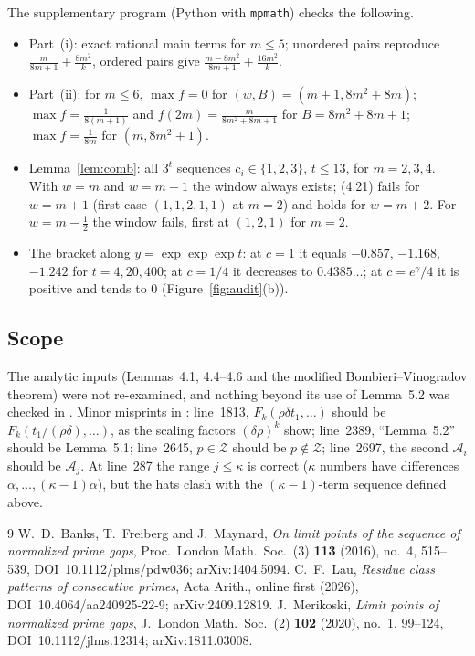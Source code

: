 \documentclass[11pt,a4paper]{amsart}
\theoremstyle{remark}
\newcommand{\cA}{\mathcal{A}}
\begin{document}
The supplementary program (Python with \texttt{mpmath}) checks the following.
\begin{itemize}
\item Part~(i): exact rational main terms for $m\le5$; unordered pairs reproduce $\frac m{8m+1}+\frac{8m^2}k$, ordered
pairs give $\frac{m-8m^2}{8m+1}+\frac{16m^2}k$.
\item Part~(ii): for $m\le6$, $\max f=0$ for $(w,B)=(m+1,8m^2+8m)$; $\max f=\frac1{8(m+1)}$ and $f(2m)=\frac m{8m^2+8m+1}$
for $B=8m^2+8m+1$; $\max f=\frac1{8m}$ for $(m,8m^2+1)$.
\item Lemma~\ref{lem:comb}: all $3^t$ sequences $c_i\in\{1,2,3\}$, $t\le13$, for $m=2,3,4$. With $w=m$ and $w=m+1$
the window always exists; (4.21) fails for $w=m+1$ (first case $(1,1,2,1,1)$ at $m=2$) and holds for $w=m+2$.
For $w=m-\frac12$ the window fails, first at $(1,2,1)$ for $m=2$.
\item The bracket along $y=\exp\exp\exp t$: at $c=1$ it equals $-0.857$, $-1.168$, $-1.242$ for $t=4,20,400$; at
$c=1/4$ it decreases to $0.4385\ldots$; at $c=e^\gamma/4$ it is positive and tends to $0$
(Figure~\ref{fig:audit}(b)).
\end{itemize}

\enlargethispage{2\baselineskip}%
\subsection*{Scope} The analytic inputs (Lemmas~4.1, 4.4--4.6 and the modified Bombieri--Vinogradov theorem) were
not re-examined, and nothing beyond its use of Lemma~5.2 was checked in \cite{Mer}. Minor misprints in \cite{BFM}:
line~1813, $F_k(\rho\delta t_1,\dots)$ should be $F_k(t_1/(\rho\delta),\dots)$, as the scaling factors $(\delta\rho)^k$
show; line~2389, ``Lemma~5.2'' should be Lemma~5.1; line~2645, $p\in\mathcal Z$ should be $p\notin\mathcal Z$;
line~2697, the second $\cA_i$ should be $\cA_j$. At line~287 the range $j\le\kappa$ is correct ($\kappa$ numbers have
differences $\alpha,\dots,(\kappa-1)\alpha$), but the hats clash with the $(\kappa-1)$-term sequence defined above.

\begin{thebibliography}{9}
 W.~D.~Banks, T.~Freiberg and J.~Maynard, \emph{On limit points of the sequence of normalized prime gaps},
Proc.\ London Math.\ Soc.\ (3) \textbf{113} (2016), no.~4, 515--539, DOI~10.1112/plms/pdw036; arXiv:1404.5094.
 C.~F.~Lau, \emph{Residue class patterns of consecutive primes}, Acta Arith., online first (2026),
DOI~10.4064/\allowbreak aa240925-22-9; arXiv:2409.12819.
 J.~Merikoski, \emph{Limit points of normalized prime gaps}, J.\ London Math.\ Soc.\ (2) \textbf{102}
(2020), no.~1, 99--124, DOI~10.1112/jlms.12314; arXiv:1811.03008.
\end{thebibliography}
\end{document}
